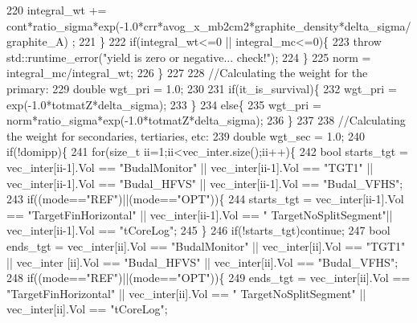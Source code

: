 \begin{DoxyCode}
220         integral\_wt += cont*ratio\_sigma*exp(-1.0*crr*avog\_x\_mb2cm2*graphite\_density*delta\_sigma/graphite\_A)
      ;
221       \}
222       \textcolor{keywordflow}{if}(integral\_wt<=0 || integral\_mc<=0)\{
223         \textcolor{keywordflow}{throw} std::runtime\_error(\textcolor{stringliteral}{"yield is zero or negative... check!"});
224       \}     
225       norm = integral\_mc/integral\_wt;
226     \}
227     
228     \textcolor{comment}{//Calculating the weight for the primary:}
229     \textcolor{keywordtype}{double} wgt\_pri = 1.0;
230     
231     \textcolor{keywordflow}{if}(it\_is\_survival)\{
232       wgt\_pri = exp(-1.0*totmatZ*delta\_sigma);
233     \}
234     \textcolor{keywordflow}{else}\{
235       wgt\_pri = norm*ratio\_sigma*exp(-1.0*totmatZ*delta\_sigma);
236     \}
237     
238     \textcolor{comment}{//Calculating the weight for secondaries, tertiaries, etc:}
239     \textcolor{keywordtype}{double} wgt\_sec = 1.0;
240     \textcolor{keywordflow}{if}(!domipp)\{
241       \textcolor{keywordflow}{for}(\textcolor{keywordtype}{size\_t} ii=1;ii<vec\_inter.size();ii++)\{
242         \textcolor{keywordtype}{bool} starts\_tgt = vec\_inter[ii-1].Vol == \textcolor{stringliteral}{"BudalMonitor"} || vec\_inter[ii-1].Vol == \textcolor{stringliteral}{"TGT1"} || 
      vec\_inter[ii-1].Vol == \textcolor{stringliteral}{"Budal\_HFVS"}  || vec\_inter[ii-1].Vol == \textcolor{stringliteral}{"Budal\_VFHS"};
243         \textcolor{keywordflow}{if}((mode==\textcolor{stringliteral}{"REF"})||(mode==\textcolor{stringliteral}{"OPT"}))\{
244           starts\_tgt = vec\_inter[ii-1].Vol == \textcolor{stringliteral}{"TargetFinHorizontal"} || vec\_inter[ii-1].Vol == \textcolor{stringliteral}{"
      TargetNoSplitSegment"}|| vec\_inter[ii-1].Vol == \textcolor{stringliteral}{"tCoreLog"};
245         \}
246         \textcolor{keywordflow}{if}(!starts\_tgt)\textcolor{keywordflow}{continue};
247         \textcolor{keywordtype}{bool} ends\_tgt = vec\_inter[ii].Vol   == \textcolor{stringliteral}{"BudalMonitor"} || vec\_inter[ii].Vol   == \textcolor{stringliteral}{"TGT1"} || vec\_inter
      [ii].Vol   == \textcolor{stringliteral}{"Budal\_HFVS"}  || vec\_inter[ii].Vol   == \textcolor{stringliteral}{"Budal\_VFHS"};
248         \textcolor{keywordflow}{if}((mode==\textcolor{stringliteral}{"REF"})||(mode==\textcolor{stringliteral}{"OPT"}))\{
249           ends\_tgt = vec\_inter[ii].Vol   == \textcolor{stringliteral}{"TargetFinHorizontal"} || vec\_inter[ii].Vol   == \textcolor{stringliteral}{"
      TargetNoSplitSegment"} || vec\_inter[ii].Vol == \textcolor{stringliteral}{"tCoreLog"};

\end{DoxyCode}
